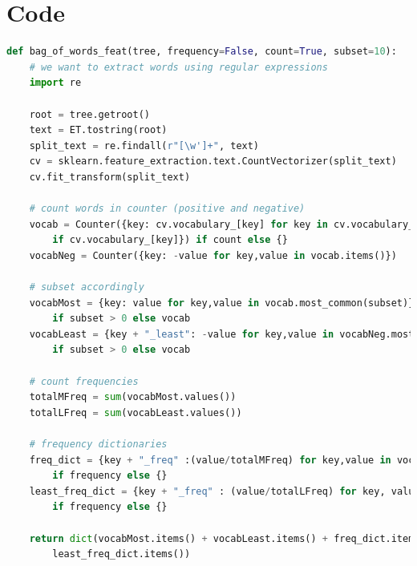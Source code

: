 \documentclass[letterpaper]{article}
\begin{document}
\pagebreak
\clearpage
\section{Code}
 \label{sec:code}
\begin{lstlisting}[language=Python]
def bag_of_words_feat(tree, frequency=False, count=True, subset=10):
    # we want to extract words using regular expressions
    import re
    
    root = tree.getroot()
    text = ET.tostring(root)
    split_text = re.findall(r"[\w']+", text)
    cv = sklearn.feature_extraction.text.CountVectorizer(split_text)
    cv.fit_transform(split_text)
    
    # count words in counter (positive and negative)
    vocab = Counter({key: cv.vocabulary_[key] for key in cv.vocabulary_.keys() 
    	if cv.vocabulary_[key]}) if count else {}
    vocabNeg = Counter({key: -value for key,value in vocab.items()})
    
    # subset accordingly
    vocabMost = {key: value for key,value in vocab.most_common(subset)} 
    	if subset > 0 else vocab
    vocabLeast = {key + "_least": -value for key,value in vocabNeg.most_common(subset)} 
    	if subset > 0 else vocab
    
    # count frequencies
    totalMFreq = sum(vocabMost.values())
    totalLFreq = sum(vocabLeast.values())
    
    # frequency dictionaries
    freq_dict = {key + "_freq" :(value/totalMFreq) for key,value in vocabMost.items()} 
    	if frequency else {}
    least_freq_dict = {key + "_freq" : (value/totalLFreq) for key, value in vocabLeast.items()} 
    	if frequency else {}
    
    return dict(vocabMost.items() + vocabLeast.items() + freq_dict.items() +
    	least_freq_dict.items())
\end{lstlisting}
\end{document}

